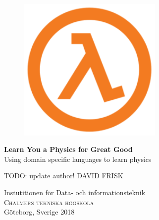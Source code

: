 
\begin{titlepage}

\addtolength{\voffset}{2cm}

\begin{figure}[H]
\centering
\vspace{2cm}	%
\includegraphics[height=7cm, width=0.7\linewidth]{figure/Lambda.png}
\end{figure}

\mbox{}
\vfill
\renewcommand{\familydefault}{\sfdefault} \normalfont %
\textbf{{\Huge 	Learn You a Physics for Great Good}} 	\\[0.5cm]
  {\Large Using domain specific languages to learn physics} \setlength{\parskip}{1cm}

{\Large TODO: update author! DAVID FRISK} \setlength{\parskip}{2.9cm}

Instutitionen för Data- och informationsteknik \\
\textsc{Chalmers tekniska högskola} \\
Göteborg, Sverige 2018

\renewcommand{\familydefault}{\rmdefault} \normalfont %
\end{titlepage}


\newpage
\restoregeometry
\thispagestyle{empty}
\mbox{}


